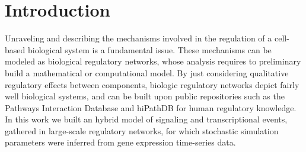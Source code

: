 
\section{Introduction}






Unraveling and describing the mechanisms involved in the regulation of a cell-based biological system is a fundamental 
issue. These mechanisms can be modeled as biological regulatory networks, whose analysis requires to preliminary build a 
mathematical or computational model. 
By just considering qualitative regulatory effects between components, biologic regulatory networks
depict fairly well biological systems, and can be built upon public repositories such as the Pathways 
Interaction Database \cite{schaefer2009pid} and  
hiPathDB \cite{yu2012hipathdb} for human regulatory knowledge.
In this work we built an hybrid model of signaling and transcriptional events, gathered in large-scale regulatory networks, 
for which stochastic simulation parameters were inferred from 
gene expression time-series data.  


